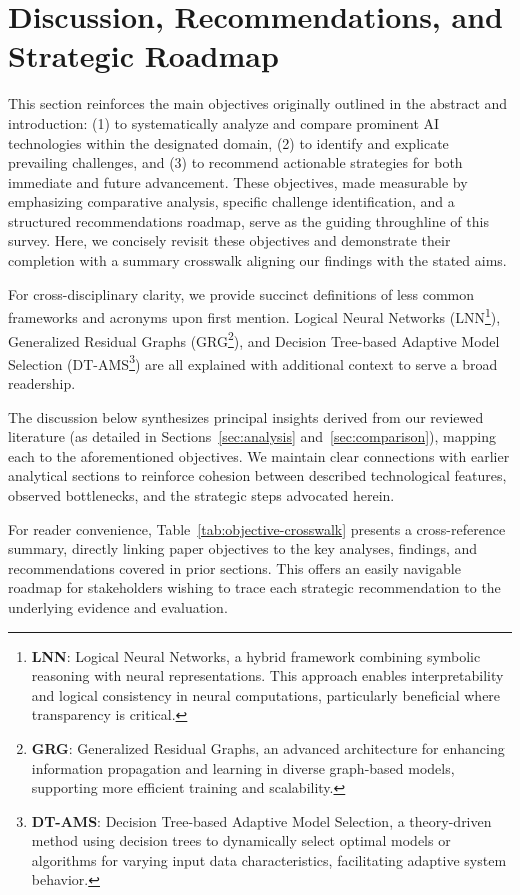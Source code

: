 \documentclass[sigconf]{acmart}
\begin{document}
\section{Discussion, Recommendations, and Strategic Roadmap}

This section reinforces the main objectives originally outlined in the abstract and introduction: (1) to systematically analyze and compare prominent AI technologies within the designated domain, (2) to identify and explicate prevailing challenges, and (3) to recommend actionable strategies for both immediate and future advancement. These objectives, made measurable by emphasizing comparative analysis, specific challenge identification, and a structured recommendations roadmap, serve as the guiding throughline of this survey. Here, we concisely revisit these objectives and demonstrate their completion with a summary crosswalk aligning our findings with the stated aims.

For cross-disciplinary clarity, we provide succinct definitions of less common frameworks and acronyms upon first mention. Logical Neural Networks (LNN\footnote{\textbf{LNN}: Logical Neural Networks, a hybrid framework combining symbolic reasoning with neural representations. This approach enables interpretability and logical consistency in neural computations, particularly beneficial where transparency is critical.}), Generalized Residual Graphs (GRG\footnote{\textbf{GRG}: Generalized Residual Graphs, an advanced architecture for enhancing information propagation and learning in diverse graph-based models, supporting more efficient training and scalability.}), and Decision Tree-based Adaptive Model Selection (DT-AMS\footnote{\textbf{DT-AMS}: Decision Tree-based Adaptive Model Selection, a theory-driven method using decision trees to dynamically select optimal models or algorithms for varying input data characteristics, facilitating adaptive system behavior.}) are all explained with additional context to serve a broad readership.

The discussion below synthesizes principal insights derived from our reviewed literature (as detailed in Sections~\ref{sec:analysis} and~\ref{sec:comparison}), mapping each to the aforementioned objectives. We maintain clear connections with earlier analytical sections to reinforce cohesion between described technological features, observed bottlenecks, and the strategic steps advocated herein. 

For reader convenience, Table~\ref{tab:objective-crosswalk} presents a cross-reference summary, directly linking paper objectives to the key analyses, findings, and recommendations covered in prior sections. This offers an easily navigable roadmap for stakeholders wishing to trace each strategic recommendation to the underlying evidence and evaluation.
\vspace{0.5em}
\end{document}
